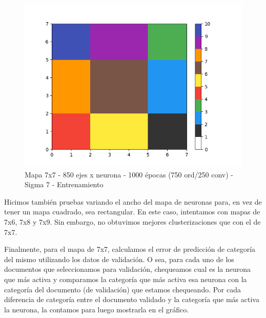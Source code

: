 \begin{figure}[!htbp]
  \begin{center}
    \includegraphics[scale=0.6]{../img/map7x7_1000ep_850en_sigma7_faseord750_corregido.png}
  \caption{Mapa 7x7 - 850 ejes x neurona - 1000 épocas (750 ord/250 conv) - Sigma 7 - Entrenamiento}
  \end{center}
\end{figure}

Hicimos también pruebas variando el ancho del mapa de neuronas para, en vez de tener un mapa cuadrado, sea rectangular. En este caso, intentamos con mapas de 7x6, 7x8 y 7x9. Sin embargo, no obtuvimos mejores clusterizaciones que con el de 7x7.

Finalmente, para el mapa de 7x7, calculamos el error de predicción de categoría del mismo utilizando los datos de validación. O sea, para cada uno de los documentos que seleccionamos para validación, chequeamos cual es la neurona que más activa y comparamos la categoría que más activa esa neurona con la categoría del documento (de validación) que estamos chequeando. Por cada diferencia de categoría entre el documento validado y la categoría que más activa la neurona, la contamos para luego mostrarla en el gráfico.

